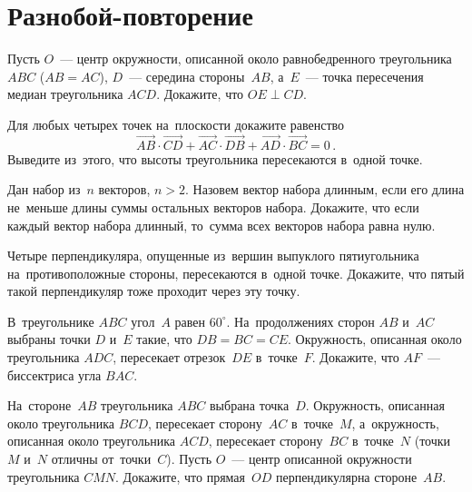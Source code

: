 

\section*{Разнобой-повторение}


\begin{problems}
\let\ov\overrightarrow

\item
Пусть $O$~--- центр окружности, описанной около равнобедренного треугольника
$ABC$ ($AB = AC$), $D$~--- середина стороны~$AB$, а~$E$~--- точка пересечения
медиан треугольника $ACD$.
Докажите, что $OE \perp CD$.

\item
\subproblem
Для любых четырех точек на~плоскости докажите равенство
\[
    \ov{AB} \cdot \ov{CD} +
    \ov{AC} \cdot \ov{DB} +
    \ov{AD} \cdot \ov{BC}
=
    0
\, . \]
\subproblem
Выведите из~этого, что высоты треугольника пересекаются в~одной точке.

\item
Дан набор из~$n$ векторов, $n > 2$.
Назовем вектор набора длинным, если его длина не~меньше длины суммы остальных
векторов набора.
Докажите, что если каждый вектор набора длинный, то~сумма всех векторов набора
равна нулю.

\item
Четыре перпендикуляра, опущенные из~вершин выпуклого пятиугольника
на~противоположные стороны, пересекаются в~одной точке.
Докажите, что пятый такой перпендикуляр тоже проходит через эту точку.

\item
В~треугольнике $ABC$ угол~$A$ равен $60^\circ$.
На~продолжениях сторон $AB$ и~$AC$ выбраны точки $D$ и~$E$ такие, что
$DB = BC = CE$.
Окружность, описанная около треугольника $ADC$, пересекает отрезок~$DE$
в~точке~$F$.
Докажите, что $AF$~--- биссектриса угла $BAC$.

\item
На~стороне~$AB$ треугольника $ABC$ выбрана точка~$D$.
Окружность, описанная около треугольника $BCD$, пересекает сторону~$AC$
в~точке~$M$, а~окружность, описанная около треугольника $ACD$, пересекает
сторону~$BC$ в~точке~$N$ (точки $M$ и~$N$ отличны от~точки~$C$).
Пусть $O$~--- центр описанной окружности треугольника $CMN$.
Докажите, что прямая~$OD$ перпендикулярна стороне~$AB$.


\end{problems}
